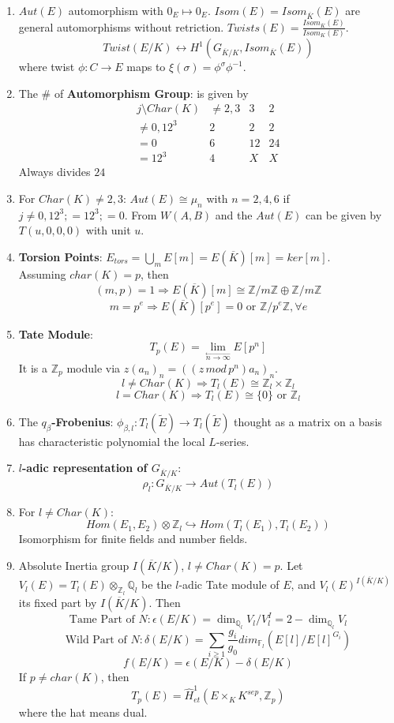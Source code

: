 \documentclass{article}
\newcommand{\Q}{\mathbb{Q}}
\newcommand{\Z}{\mathbb{Z}}
\newcommand{\F}{\mathbb{F}}
\newcommand{\ra}{\rightarrow}
\newcommand{\la}{\leftarrow}
\newcommand{\Ra}{\Rightarrow}
\newcommand{\lra}{\leftrightarrow}
\newcommand{\hra}{\hookrightarrow}
\newcommand{\ACK}{\overline{K}}
\begin{document}
\begin{multicols}{2}
\begin{enumerate}
\item $Aut(E)$ automorphism with $0_E \mapsto 0_E$. $Isom(E) = Isom_{\ACK}(E)$ are general automorphisms without retriction. $Twists(E) = \frac{Isom_{\ACK}(E)}{Isom_K(E)}$. 
\[Twist(E/K) \lra H^1(G_{\ACK/K},Isom_{\ACK}(E))\]
where twist $\phi: C \ra E$ maps to $\xi(\sigma) = \phi^{\sigma}\phi^{-1}$. 

\item The $\#$ of \textbf{Automorphism Group}: is given by 
\[ \begin{array}{cccc} j\setminus Char(K) & \neq 2,3 & 3 & 2 \\
\neq 0,12^3 & 2 & 2 & 2 \\
=0 & 6 & 12 & 24 \\
= 12^3 & 4 & X & X \end{array}\]
Always divides $24$

\item For $Char(K) \neq 2,3$: $Aut(E) \cong \mu_n$ with $n = 2,4,6$ if $j \neq 0,12^3; = 12^3; = 0$. From $W(A,B)$ and the $Aut(E)$ can be given by $T(u,0,0,0)$ with unit $u$.

\item \textbf{Torsion Points}: $E_{tors} = \bigcup_m E[m] = E(\ACK)[m] = ker[m]$.\\
Assuming $char(K) = p$, then 
\[(m,p) = 1 \Ra E(\ACK)[m] \cong \Z/m\Z \oplus \Z/m\Z\]
\[m = p^e \Ra E(\ACK)[p^e] = 0 \textrm{ or } \Z/p^e\Z, \forall e\] 

\item \textbf{Tate Module}:
\[T_p(E) = \lim_{\overset{\la}{n \ra \infty}} E[p^n]\]
It is a $\Z_p$ module via $z(a_n)_n = ((z\,mod\,p^n)a_n)_n$.
\[l \neq Char(K) \Ra T_l(E) \cong \Z_l \times \Z_l\]
\[l = Char(K) \Ra T_l(E) \cong \{0\} \textrm{ or } \Z_l\]

\item The \textbf{$q_\beta$-Frobenius}: $\phi_{\beta,l}: T_l(\tilde{E}) \ra T_l(\tilde{E})$ thought as a matrix on a basis has characteristic polynomial the local $L$-series.

\item \textbf{$l$-adic representation of $G_{\overline{K}/K}$}: 
\[\rho_l: G_{\overline{K}/K} \ra Aut(T_l(E))\]

\item For $l \neq Char(K)$:
\[Hom(E_1,E_2)\otimes \Z_l \hra Hom(T_l(E_1), T_l(E_2))\]
Isomorphism for finite fields and number fields. 

\item Absolute Inertia group $I(\overline{K}/K)$, $l \neq Char(K) = p$. Let $V_l(E) = T_l(E) \otimes_{\Z_l} \Q_l$ be the $l$-adic Tate module of $E$, and $V_l(E)^{I(\overline{K}/K)}$ its fixed part by $I(\overline{K}/K)$. Then 
\[\textrm{Tame Part of }N: \epsilon(E/K) = \dim_{\Q_l}V_l/V_l^I = 2 - \dim_{\Q_l}V_l\]
\[\textrm{Wild Part of }N: \delta(E/K) =  \sum_{ i \geq 1} \frac{g_i}{g_0} dim_{\F_l}(E[l]/E[l]^{G_i})\]
\[f(E/K) = \epsilon(E/K) - \delta(E/K)\]
If $p \neq char(K)$, then
\[T_p(E) = \hat{H}_{et}^1(E \times_K K^{sep}, \Z_p)\]
where the hat means dual.


\end{enumerate}
\end{multicols}
\end{document}
